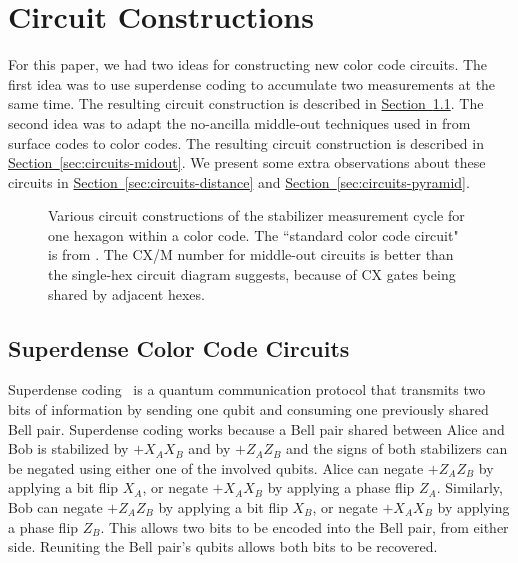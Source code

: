 \documentclass[onecolumn,unpublished,a4paper]{quantumarticle}
\theoremstyle{definition}
\theoremstyle{definition}
\theoremstyle{definition}
\renewcommand{\sec}[1]{\hyperref[sec:#1]{Section~\ref*{sec:#1}}}
\begin{document}
\section{Circuit Constructions}
\label{sec:circuits}

For this paper, we had two ideas for constructing new color code circuits.
The first idea was to use superdense coding to accumulate two measurements at the same time.
The resulting circuit construction is described in \sec{circuits-superdense}.
The second idea was to adapt the no-ancilla middle-out techniques used in \cite{mccewen2023threecouplersurface} from surface codes to color codes.
The resulting circuit construction is described in \sec{circuits-midout}.
We present some extra observations about these circuits in \sec{circuits-distance} and \sec{circuits-pyramid}.

\begin{figure}
    \centering
    \caption{
        Various circuit constructions of the stabilizer measurement cycle for one hexagon within a color code.
        The ``standard color code circuit" is from \cite{baireuther2019nncolorcode}.
        The CX/M number for middle-out circuits is better than the single-hex circuit diagram suggests, because of CX gates being shared by adjacent hexes.
    }
    \label{fig:circuits}
\end{figure}


\subsection{Superdense Color Code Circuits}
\label{sec:circuits-superdense}

Superdense coding~\cite{bennett1992superdense} is a quantum communication protocol that transmits two bits of information by sending one qubit and consuming one previously shared Bell pair.
Superdense coding works because a Bell pair shared between Alice and Bob is stabilized by $+X_A X_B$ and by $+Z_A Z_B$ and the signs of both stabilizers can be negated using either one of the involved qubits.
Alice can negate $+Z_A Z_B$ by applying a bit flip $X_A$, or negate $+X_A X_B$ by applying a phase flip $Z_A$.
Similarly, Bob can negate $+Z_A Z_B$ by applying a bit flip $X_B$, or negate $+X_A X_B$ by applying a phase flip $Z_B$.
This allows two bits to be encoded into the Bell pair, from either side.
Reuniting the Bell pair's qubits allows both bits to be recovered.
\end{document}
